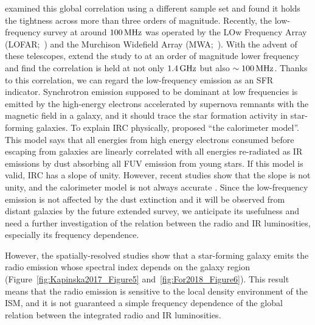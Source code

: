\citet{Condon1991a,Yun2001a, Bell2003} examined this global correlation using a different sample set and found it holds the tightness across more than three orders of magnitude.
Recently, the low-frequency survey at around $100\,\mathrm{MHz}$ was operated by the LOw Frequency Array (LOFAR;~\citealt{VanHaarlem2013}) and the Murchison Widefield Array (MWA;~\citealt{Tingay2013a}).
With the advent of these telescopes, \citet{CalistroRivera2017a, Read2018, Wang2019} extend the study to at an order of magnitude lower frequency and find the correlation is held at not only $1.4\,\mathrm{GHz}$ but also $\sim 100\,\mathrm{MHz}$.
Thanks to this correlation, we can regard the low-frequency emission as an SFR indicator.
Synchrotron emission supposed to be dominant at low frequencies is emitted by the high-energy electrons accelerated by supernova remnants with the magnetic field in a galaxy, and it should trace the star formation activity in star-forming galaxies.
To explain IRC physically, \citet{Volk1989} proposed ``the calorimeter model''.
This model says that all energies from high energy electrons consumed before escaping from galaxies are linearly correlated with all energies re-radiated as IR emissions by dust absorbing all FUV emission from young stars.
If this model is valid, IRC has a slope of unity.
However, recent studies show that the slope is not unity, and the calorimeter model is not always accurate \citep{CalistroRivera2017a, Read2018}.
Since the low-frequency emission is not affected by the dust extinction \citep{Yun2001a, Murphy2011} and it will be observed from distant galaxies by the future extended survey, we anticipate its usefulness and need a further investigation of the relation between the radio and IR luminosities, especially its frequency dependence.

However, the spatially-resolved studies show that a star-forming galaxy emits the radio emission whose spectral index depends on the galaxy region \citep{Kapinska2017a, For2018a, Heesen2019} (Figure~\ref{fig:Kapinska2017_Figure5} and~\ref{fig:For2018_Figure6}).
This result means that the radio emission is sensitive to the local density environment of the ISM, and it is not guaranteed a simple frequency dependence of the global relation between the integrated radio and IR luminosities.

